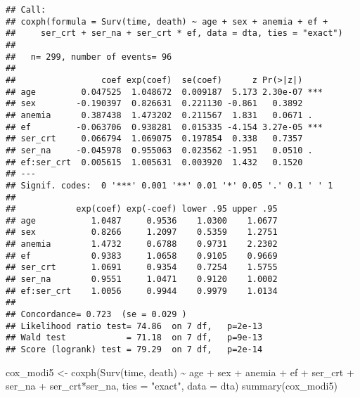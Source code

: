 \documentclass[
]{article}
\newenvironment{Shaded}{\begin{snugshade}}{\end{snugshade}}
\newcommand{\AttributeTok}[1]{\textcolor[rgb]{0.77,0.63,0.00}{#1}}
\newcommand{\FunctionTok}[1]{\textcolor[rgb]{0.00,0.00,0.00}{#1}}
\newcommand{\NormalTok}[1]{#1}
\newcommand{\OtherTok}[1]{\textcolor[rgb]{0.56,0.35,0.01}{#1}}
\newcommand{\SpecialCharTok}[1]{\textcolor[rgb]{0.00,0.00,0.00}{#1}}
\newcommand{\StringTok}[1]{\textcolor[rgb]{0.31,0.60,0.02}{#1}}
\begin{document}
\begin{verbatim}
## Call:
## coxph(formula = Surv(time, death) ~ age + sex + anemia + ef + 
##     ser_crt + ser_na + ser_crt * ef, data = dta, ties = "exact")
## 
##   n= 299, number of events= 96 
## 
##                 coef exp(coef)  se(coef)      z Pr(>|z|)    
## age         0.047525  1.048672  0.009187  5.173 2.30e-07 ***
## sex        -0.190397  0.826631  0.221130 -0.861   0.3892    
## anemia      0.387438  1.473202  0.211567  1.831   0.0671 .  
## ef         -0.063706  0.938281  0.015335 -4.154 3.27e-05 ***
## ser_crt     0.066794  1.069075  0.197854  0.338   0.7357    
## ser_na     -0.045978  0.955063  0.023562 -1.951   0.0510 .  
## ef:ser_crt  0.005615  1.005631  0.003920  1.432   0.1520    
## ---
## Signif. codes:  0 '***' 0.001 '**' 0.01 '*' 0.05 '.' 0.1 ' ' 1
## 
##            exp(coef) exp(-coef) lower .95 upper .95
## age           1.0487     0.9536    1.0300    1.0677
## sex           0.8266     1.2097    0.5359    1.2751
## anemia        1.4732     0.6788    0.9731    2.2302
## ef            0.9383     1.0658    0.9105    0.9669
## ser_crt       1.0691     0.9354    0.7254    1.5755
## ser_na        0.9551     1.0471    0.9120    1.0002
## ef:ser_crt    1.0056     0.9944    0.9979    1.0134
## 
## Concordance= 0.723  (se = 0.029 )
## Likelihood ratio test= 74.86  on 7 df,   p=2e-13
## Wald test            = 71.18  on 7 df,   p=9e-13
## Score (logrank) test = 79.29  on 7 df,   p=2e-14
\end{verbatim}

\begin{Shaded}
\begin{Highlighting}[]
\NormalTok{cox\_modi5 }\OtherTok{\textless{}{-}} \FunctionTok{coxph}\NormalTok{(}\FunctionTok{Surv}\NormalTok{(time, death) }\SpecialCharTok{\textasciitilde{}}\NormalTok{ age }\SpecialCharTok{+}\NormalTok{ sex }\SpecialCharTok{+}\NormalTok{ anemia }\SpecialCharTok{+}\NormalTok{ ef }\SpecialCharTok{+}\NormalTok{ ser\_crt }\SpecialCharTok{+}\NormalTok{ ser\_na }\SpecialCharTok{+}\NormalTok{ ser\_crt}\SpecialCharTok{*}\NormalTok{ser\_na, }\AttributeTok{ties =} \StringTok{"exact"}\NormalTok{, }\AttributeTok{data =}\NormalTok{ dta)}
\FunctionTok{summary}\NormalTok{(cox\_modi5)}
\end{Highlighting}
\end{Shaded}
\end{document}
